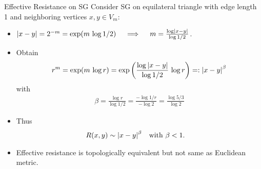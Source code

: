 \begin{frame}[allowframebreaks]{Effective Resistance on SG}
    Consider SG on equilateral triangle with edge length 1 and neighboring vertices $x,y \in V_{m}$:
    \begin{itemize}
        \item $\left\vert x-y \right\vert=2^{-m} = \exp(m\, \log{1/2}) \quad\implies\quad m = \frac{\log\left\vert x-y \right\vert}{\log{1/2}}$.
        \item Obtain
        \begin{align*}
            r^{m} = \exp(m\, \log{r})
            = \exp\left( \frac{\log\left\vert x-y \right\vert}{\log{1/2}} \, \log{r} \right)
            =: \left\vert x-y \right\vert^{\beta}
        \end{align*}
        with
        \begin{align*}
            \beta = \frac{\log{r}}{\log{1/2}}
            = \frac{-\log{1/r}}{-\log{2}}
            = \frac{\log{5/3}}{\log{2}}
        \end{align*}
        \item Thus
        \begin{align*}
            R(x,y) &\sim \left\vert x-y \right\vert^{\beta} && \text{with } \beta < 1.
        \end{align*}
        \item Effective resistance is topologically equivalent but not same as Euclidean metric.
    \end{itemize}
\end{frame}


